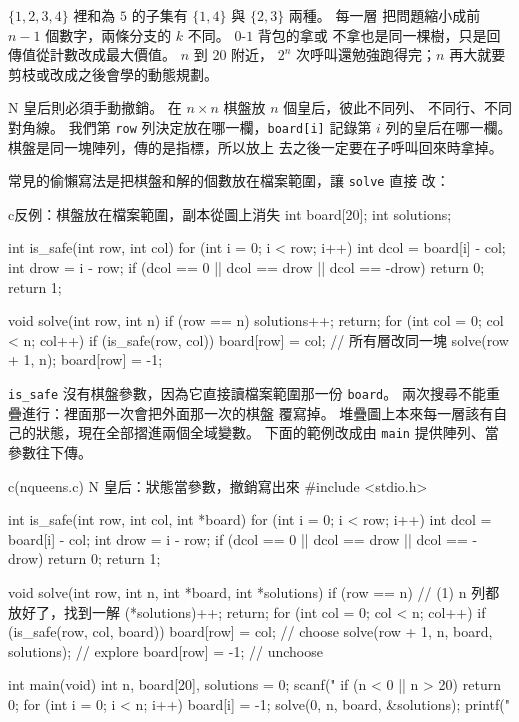 $\{1,2,3,4\}$ 裡和為 $5$ 的子集有 $\{1,4\}$ 與 $\{2,3\}$ 兩種。 每一層
把問題縮小成前 $n-1$ 個數字，兩條分支的 $k$ 不同。 $0$-$1$ 背包的拿或
不拿也是同一棵樹，只是回傳值從計數改成最大價值。 $n$ 到 $20$ 附近，
$2^n$ 次呼叫還勉強跑得完；$n$ 再大就要剪枝或改成之後會學的動態規劃。

N 皇后則必須手動撤銷。 在 $n \times n$ 棋盤放 $n$ 個皇后，彼此不同列、
不同行、不同對角線。 我們第 \texttt{row} 列決定放在哪一欄，\texttt{board[i]}
記錄第 $i$ 列的皇后在哪一欄。 棋盤是同一塊陣列，傳的是指標，所以放上
去之後一定要在子呼叫回來時拿掉。

常見的偷懶寫法是把棋盤和解的個數放在檔案範圍，讓 \texttt{solve} 直接
改：

\begin{code}{c}{反例：棋盤放在檔案範圍，副本從圖上消失}
int board[20];
int solutions;

int is_safe(int row, int col) {
    for (int i = 0; i < row; i++) {
        int dcol = board[i] - col;
        int drow = i - row;
        if (dcol == 0 || dcol == drow || dcol == -drow) {
            return 0;
        }
    }
    return 1;
}

void solve(int row, int n) {
    if (row == n) {
        solutions++;
        return;
    }
    for (int col = 0; col < n; col++) {
        if (is_safe(row, col)) {
            board[row] = col;      // 所有層改同一塊
            solve(row + 1, n);
            board[row] = -1;
        }
    }
}
\end{code}

\texttt{is\_safe} 沒有棋盤參數，因為它直接讀檔案範圍那一份
\texttt{board}。 兩次搜尋不能重疊進行：裡面那一次會把外面那一次的棋盤
覆寫掉。 堆疊圖上本來每一層該有自己的狀態，現在全部摺進兩個全域變數。
下面的範例改成由 \texttt{main} 提供陣列、當參數往下傳。

\begin{example}{c}{(nqueens.c) N 皇后：狀態當參數，撤銷寫出來}
#include <stdio.h>

int is_safe(int row, int col, int *board) {
    for (int i = 0; i < row; i++) {
        int dcol = board[i] - col;
        int drow = i - row;
        if (dcol == 0 || dcol == drow || dcol == -drow) {
            return 0;
        }
    }
    return 1;
}

void solve(int row, int n, int *board, int *solutions) {
    if (row == n) {            // (1) n 列都放好了，找到一解
        (*solutions)++;
        return;
    }
    for (int col = 0; col < n; col++) {
        if (is_safe(row, col, board)) {
            board[row] = col;                       // choose
            solve(row + 1, n, board, solutions);    // explore
            board[row] = -1;                        // unchoose
        }
    }
}

int main(void) {
    int n, board[20], solutions = 0;
    scanf("%
    if (n < 0 || n > 20) {
        return 0;
    }
    for (int i = 0; i < n; i++) {
        board[i] = -1;
    }
    solve(0, n, board, &solutions);
    printf("%
}
\end{example}

